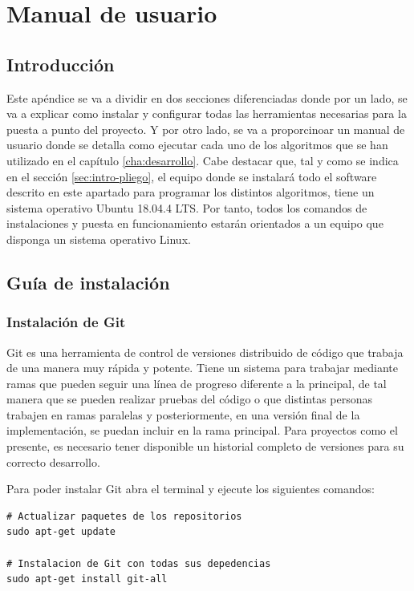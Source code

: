 
\chapter{Manual de usuario}
\label{cha:manual-usuario}

\section{Introducción}
\label{sec:intro-manual-de-usuario}

Este apéndice se va a dividir en dos secciones diferenciadas donde por un lado, se va a explicar como instalar y configurar todas las herramientas necesarias para la puesta a punto del proyecto. Y por otro lado, se va a proporcinoar un manual de usuario donde se detalla como ejecutar cada uno de los algoritmos que se han utilizado en el capítulo \ref{cha:desarrollo}.
Cabe destacar que, tal y como se indica en el sección \ref{sec:intro-pliego}, el equipo donde se instalará todo el software descrito en este apartado para programar los distintos algoritmos, tiene un sistema operativo Ubuntu 18.04.4 LTS. Por tanto, todos los comandos de instalaciones y puesta en funcionamiento estarán orientados a un equipo que disponga un sistema operativo Linux.

\section{Guía de instalación}
\label{sec:sec-guia-instalacion}

\subsection{Instalación de Git}
\label{subsec:instalacion-git}

Git es una herramienta de control de versiones distribuido de código que trabaja de una manera muy rápida y potente. Tiene un sistema para trabajar mediante ramas que pueden seguir una línea de progreso diferente a la principal, de tal manera que se pueden realizar pruebas del código o que distintas personas trabajen en ramas paralelas y posteriormente, en una versión final de la implementación, se puedan incluir en la rama principal. Para proyectos como el presente, es necesario tener disponible un historial completo de versiones para su correcto desarrollo.

Para poder instalar Git abra el terminal y ejecute los siguientes comandos:

\vspace{0.5cm}
\begin{lstlisting}[language=iPython,caption=Instalación de Git,captionpos=b,label={lst:install-git}]
# Actualizar paquetes de los repositorios
sudo apt-get update

# Instalacion de Git con todas sus depedencias
sudo apt-get install git-all
\end{lstlisting}

